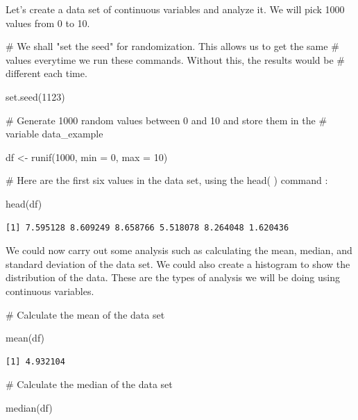 \documentclass[
  letterpaper,
  DIV=11,
  numbers=noendperiod]{scrreprt}
\newenvironment{Shaded}{\begin{snugshade}}{\end{snugshade}}
\newcommand{\AttributeTok}[1]{\textcolor[rgb]{0.40,0.45,0.13}{#1}}
\newcommand{\CommentTok}[1]{\textcolor[rgb]{0.37,0.37,0.37}{#1}}
\newcommand{\DecValTok}[1]{\textcolor[rgb]{0.68,0.00,0.00}{#1}}
\newcommand{\FunctionTok}[1]{\textcolor[rgb]{0.28,0.35,0.67}{#1}}
\newcommand{\NormalTok}[1]{\textcolor[rgb]{0.00,0.23,0.31}{#1}}
\newcommand{\OtherTok}[1]{\textcolor[rgb]{0.00,0.23,0.31}{#1}}
\begin{document}
Let's create a data set of continuous variables and analyze it. We will
pick 1000 values from 0 to 10.

\begin{Shaded}
\begin{Highlighting}[]
\CommentTok{\# We shall "set the seed" for randomization. This allows us to get the same}
\CommentTok{\# values everytime we run these commands. Without this, the results would be}
\CommentTok{\# different each time.}

\FunctionTok{set.seed}\NormalTok{(}\DecValTok{1123}\NormalTok{)}

\CommentTok{\# Generate 1000 random values between 0 and 10 and store them in the }
\CommentTok{\# variable \textquotesingle{}data\_example\textquotesingle{}}

\NormalTok{df }\OtherTok{\textless{}{-}} \FunctionTok{runif}\NormalTok{(}\DecValTok{1000}\NormalTok{, }\AttributeTok{min =} \DecValTok{0}\NormalTok{, }\AttributeTok{max =} \DecValTok{10}\NormalTok{) }

\CommentTok{\# Here are the first six values in the data set, using the head( ) command :}

\FunctionTok{head}\NormalTok{(df)}
\end{Highlighting}
\end{Shaded}

\begin{verbatim}
[1] 7.595128 8.609249 8.658766 5.518078 8.264048 1.620436
\end{verbatim}

We could now carry out some analysis such as calculating the mean,
median, and standard deviation of the data set. We could also create a
histogram to show the distribution of the data. These are the types of
analysis we will be doing using continuous variables.

\begin{Shaded}
\begin{Highlighting}[]
\CommentTok{\# Calculate the mean of the data set}

\FunctionTok{mean}\NormalTok{(df)}
\end{Highlighting}
\end{Shaded}

\begin{verbatim}
[1] 4.932104
\end{verbatim}

\begin{Shaded}
\begin{Highlighting}[]
\CommentTok{\# Calculate the median of the data set}

\FunctionTok{median}\NormalTok{(df)}
\end{Highlighting}
\end{Shaded}
\end{document}
